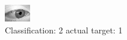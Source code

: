 \begin{figure}[h!]
\begin{center}
\includegraphics[width=0.60\columnwidth]{figures/ID2761_class_2_target_1.png}
\end{center}
\caption{ Classification: 2 actual target: 1}
\label{fig:ID2761_class_2_target_1}
\end{figure}
